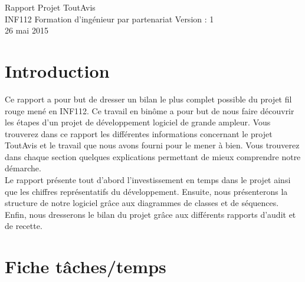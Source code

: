 \documentclass[12pt,a4paper]{report}
\begin{document}
  {Rapport Projet ToutAvis\\[10pt] INF112}
  {Formation d'ingénieur par partenariat
  \vspace{1cm}}
  {Version : 1\\ 
  \vspace{1cm}
  26 mai 2015}

\newpage
\tableofcontents
\newpage

\chapter*{Introduction}
\label{chapter:Introduction} %
\indent Ce rapport a pour but de dresser un bilan le plus complet possible du projet fil rouge mené en INF112. Ce travail en binôme a pour but de nous faire découvrir les étapes d'un projet de développement logiciel de grande ampleur. Vous trouverez dans ce rapport les différentes informations concernant le projet ToutAvis et le travail que nous avons fourni pour le mener à bien. Vous trouverez dans chaque section quelques explications permettant de mieux comprendre notre démarche.\\

Le rapport présente tout d'abord l'investissement en temps dans le projet ainsi que les chiffres représentatifs du développement. Ensuite, nous présenterons la structure de notre logiciel grâce aux diagrammes de classes et de séquences. Enfin, nous dresserons le bilan du projet grâce aux différents rapports d'audit et de recette.  

\chapter*{Fiche tâches/temps}
\label{chapter:Fiche tâches/temps} %
\end{document}

